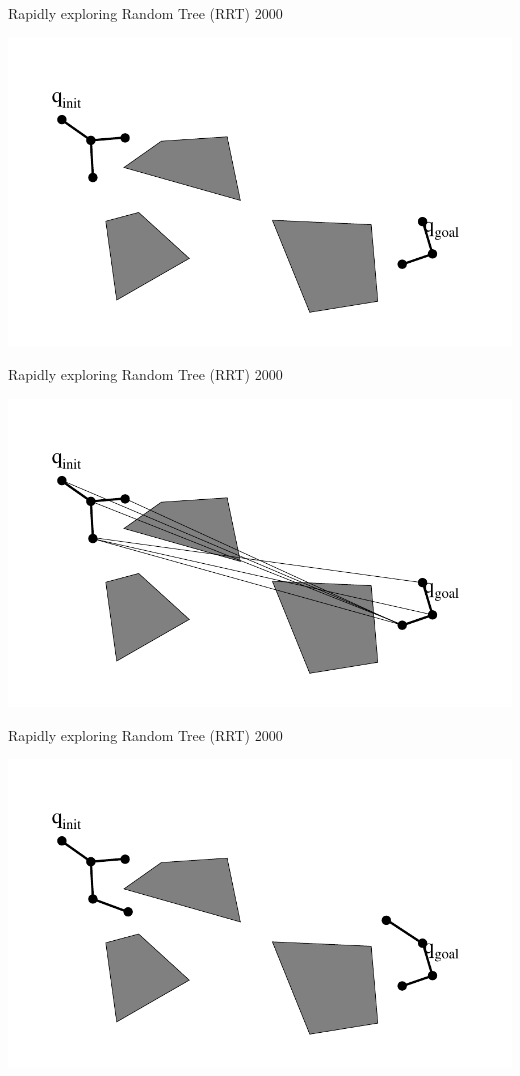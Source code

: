 \begin{frame} {Rapidly exploring Random Tree (RRT) 2000}
\centerline {
  \includegraphics[width=.8\linewidth]{figures/RRT12.pdf}
}
\end{frame}

\begin{frame} {Rapidly exploring Random Tree (RRT) 2000}
\centerline {
  \includegraphics[width=.8\linewidth]{figures/RRT13.pdf}
}
\end{frame}

\begin{frame} {Rapidly exploring Random Tree (RRT) 2000}
\centerline {
  \includegraphics[width=.8\linewidth]{figures/RRT14.pdf}
}
\end{frame}

